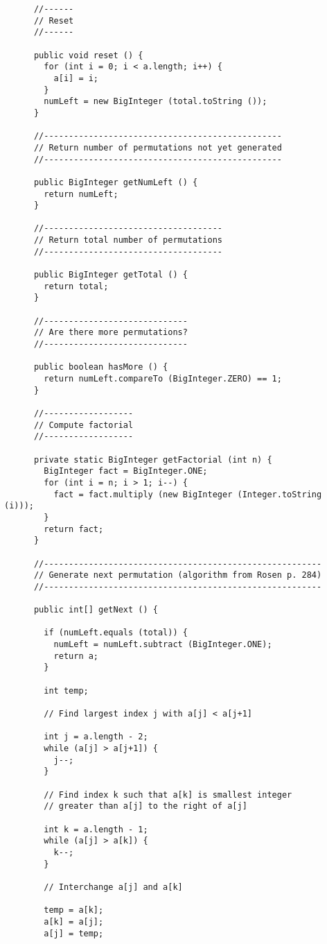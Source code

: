 \documentclass[a4paper, 11pt, oneside]{report}
\begin{document}
\begin{verbatim}
	  //------
	  // Reset
	  //------

	  public void reset () {
	    for (int i = 0; i < a.length; i++) {
	      a[i] = i;
	    }
	    numLeft = new BigInteger (total.toString ());
	  }

	  //------------------------------------------------
	  // Return number of permutations not yet generated
	  //------------------------------------------------

	  public BigInteger getNumLeft () {
	    return numLeft;
	  }

	  //------------------------------------
	  // Return total number of permutations
	  //------------------------------------

	  public BigInteger getTotal () {
	    return total;
	  }

	  //-----------------------------
	  // Are there more permutations?
	  //-----------------------------

	  public boolean hasMore () {
	    return numLeft.compareTo (BigInteger.ZERO) == 1;
	  }

	  //------------------
	  // Compute factorial
	  //------------------

	  private static BigInteger getFactorial (int n) {
	    BigInteger fact = BigInteger.ONE;
	    for (int i = n; i > 1; i--) {
	      fact = fact.multiply (new BigInteger (Integer.toString (i)));
	    }
	    return fact;
	  }

	  //--------------------------------------------------------
	  // Generate next permutation (algorithm from Rosen p. 284)
	  //--------------------------------------------------------

	  public int[] getNext () {

	    if (numLeft.equals (total)) {
	      numLeft = numLeft.subtract (BigInteger.ONE);
	      return a;
	    }

	    int temp;

	    // Find largest index j with a[j] < a[j+1]

	    int j = a.length - 2;
	    while (a[j] > a[j+1]) {
	      j--;
	    }

	    // Find index k such that a[k] is smallest integer
	    // greater than a[j] to the right of a[j]

	    int k = a.length - 1;
	    while (a[j] > a[k]) {
	      k--;
	    }

	    // Interchange a[j] and a[k]

	    temp = a[k];
	    a[k] = a[j];
	    a[j] = temp;


\end{verbatim}
\end{document}
